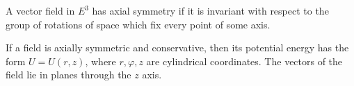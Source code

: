 A vector field in $E^3$ has axial symmetry if it is invariant with respect to the group of rotations of space which fix every point of some axis.

If a field is axially symmetric and conservative, then its potential energy has the form $U = U(r, z)$, where $r, \varphi, z$ are cylindrical coordinates. The vectors of the field lie in planes through the $z$ axis.
